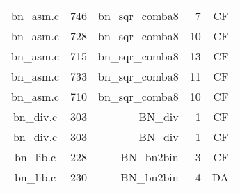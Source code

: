 \begin{table*}
\begin{tabular}{clrrr}
bn\_asm.c&746&bn\_sqr\_comba8&7 &CF\\
bn\_asm.c&728&bn\_sqr\_comba8&10&CF\\
bn\_asm.c&715&bn\_sqr\_comba8&13&CF\\
bn\_asm.c&733&bn\_sqr\_comba8&11&CF\\
bn\_asm.c&710&bn\_sqr\_comba8&10&CF\\
bn\_div.c&303&BN\_div&1 &CF\\
bn\_div.c&303&BN\_div&1 &CF\\
bn\_lib.c&228&BN\_bn2bin&3 &CF\\
bn\_lib.c&230&BN\_bn2bin&4 &DA\\
\hline
\end{tabular}
\end{table*}